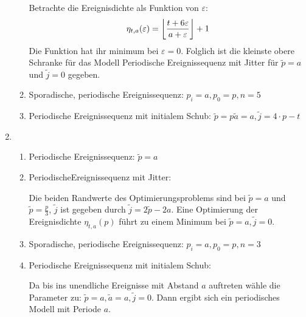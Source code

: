 \documentclass[DIN, pagenumber=false, fontsize=11pt, parskip=half]{scrartcl}
\DeclarePairedDelimiter\floor{\lfloor}{\rfloor}
\begin{document}
\begin{enumerate}[label=\roman*)]
\begin{enumerate}[label=\alph*)]
                    Betrachte die Ereignisdichte als Funktion von $\varepsilon$:
                    \begin{equation}
                        \eta_{t,a}(\varepsilon) 
                            = \floor*{\frac{t+6 \varepsilon}{a+\varepsilon}}+1
                    \end{equation}
                    Die Funktion hat ihr minimum bei $\varepsilon=0$. Folglich
                    ist die kleinste obere Schranke für das Modell
                    Periodische Ereignissequenz mit Jitter für $\tilde{p}=a$ und $\tilde{j}=0$ gegeben.
                \item Sporadische, periodische Ereignissequenz: $p_i=a, p_0=p, n=5$
                \item Periodische Ereignissequenz mit initialem Schub: 
                    $\tilde{p}=p \tilde{a}=a, \tilde{j}=4\cdot p - t$
            \end{enumerate}
        \item
            \begin{enumerate}[label=\alph*)]
                \item Periodische Ereignissequenz: $\tilde{p}=a$
                \item PeriodischeEreignissequenz mit Jitter: 

                    Die beiden Randwerte des Optimierungsproblems sind bei
                    $\tilde{p}=a$ und $\tilde{p}=\frac{p}{3}$, $\tilde{j}$ ist gegeben
                    durch $\tilde{j} = 2 \tilde{p} - 2 a$. Eine Optimierung der
                    Ereignisdichte $\eta_{t,a}(p)$ führt zu einem Minimum bei
                    $\tilde{p}=a, \tilde{j}=0$.
                \item Sporadische, periodische Ereignissequenz: $p_i=a, p_0=p, n=3$
                \item Periodische Ereignissequenz mit initialem Schub: 

                    Da bis ins unendliche Ereignisse mit Abstand $a$ auftreten wähle
                    die Parameter zu: $\tilde{p}=a, \tilde{a}=a, \tilde{j}=0$. Dann ergibt
                    sich ein periodisches Modell mit Periode $a$.
            \end{enumerate} 
    \end{enumerate}
\end{document}
